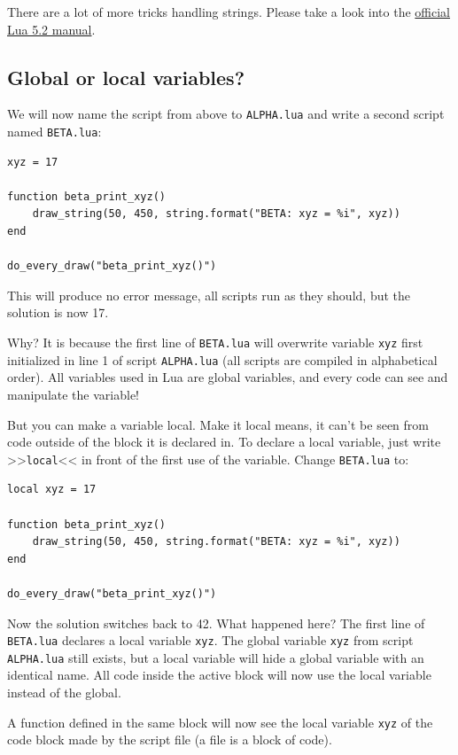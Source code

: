 \documentclass[11pt,parskip=half,a4paper]{scrartcl}
\begin{document}
There are a lot of more tricks handling strings. Please take a look into the \href{http://www.lua.org/manual/5.2/manual.html#3.1}{official Lua 5.2 manual}.

\subsection{Global or local variables?}

We will now name the script from above to \verb|ALPHA.lua| and write a second script named \verb|BETA.lua|:

\begin{lstlisting}
xyz = 17

function beta_print_xyz()
    draw_string(50, 450, string.format("BETA: xyz = %i", xyz))
end

do_every_draw("beta_print_xyz()")
\end{lstlisting}

This will produce no error message, all scripts run as they should, but the solution is now 17.

Why? It is because the first line of \verb|BETA.lua| will overwrite variable \verb|xyz| first initialized in line 1 of script \verb|ALPHA.lua| (all scripts are compiled in alphabetical order). All variables used in Lua are global variables, and every code can see and manipulate the variable!

But you can make a variable local. Make it local means, it can't be seen from code outside of the block it is declared in. To declare a local variable, just write >>\verb|local|<< in front of the first use of the variable. Change \verb|BETA.lua| to:

\begin{lstlisting}
local xyz = 17

function beta_print_xyz()
    draw_string(50, 450, string.format("BETA: xyz = %i", xyz))
end

do_every_draw("beta_print_xyz()")
\end{lstlisting}

Now the solution switches back to 42. What happened here? The first line of \verb|BETA.lua| declares a local variable \verb|xyz|. The global variable \verb|xyz| from script \verb|ALPHA.lua| still exists, but a local variable will hide a global variable with an identical name. All code inside the active block will now use the local variable instead of the global.

A function defined in the same block will now see the local variable \verb|xyz| of the code block made by the script file (a file is a block of code).
\end{document}
